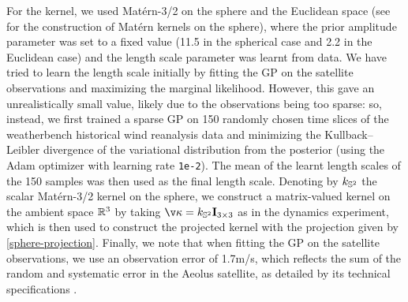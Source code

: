 For the kernel, we used Mat\'ern-3/2 on the sphere and the Euclidean space (see \textcite{Borovitskiy2020} for the construction of Mat\'ern kernels on the sphere), where the prior amplitude parameter was set to a fixed value (11.5 in the spherical case and 2.2 in the Euclidean case) and the length scale parameter was learnt from data.
We have tried to learn the length scale initially by fitting the GP on the satellite observations and maximizing the marginal likelihood.
However, this gave an unrealistically small value, likely due to the observations being too sparse: so, instead, we first trained a sparse GP on 150 randomly chosen time slices of the weatherbench historical wind reanalysis data and minimizing the Kullback--Leibler divergence of the variational distribution from the posterior (using the Adam optimizer with learning rate \texttt{1e-2}).
The mean of the learnt length scales of the 150 samples was then used as the final length scale.
Denoting by $k_{\bb{S}^2}$ the scalar Mat\'ern-3/2 kernel on the sphere, we construct a matrix-valued kernel on the ambient space $\mathbb{R}^3$ by taking $\v\kappa = k_{\bb{S}^2} \m{I}_{3 \x 3}$ as in the dynamics experiment, which is then used to construct the projected kernel with the projection given by \eqref{sphere-projection}.
Finally, we note that when fitting the GP on the satellite observations, we use an observation error of 1.7m/s, which reflects the sum of the random and systematic error in the Aeolus satellite, as detailed by its technical specifications \cite{aeolus-info}.
